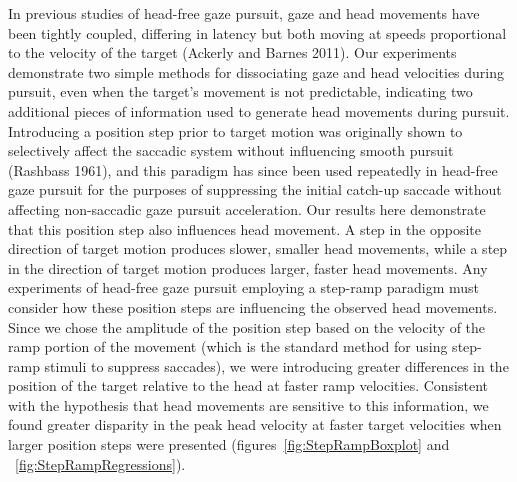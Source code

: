 \documentclass[12pt]{article}
\begin{document}
In previous studies of head-free gaze pursuit, gaze and head movements have been tightly coupled, differing in latency but both moving at speeds proportional to the velocity of the target (Ackerly and Barnes 2011). Our experiments demonstrate two simple methods for dissociating gaze and head velocities during pursuit, even when the target’s movement is not predictable, indicating two additional pieces of information used to generate head movements during pursuit.  Introducing a position step prior to target motion was originally shown to selectively affect the saccadic system without influencing smooth pursuit (Rashbass 1961), and this paradigm has since been used repeatedly in head-free gaze pursuit for the purposes of suppressing the initial catch-up saccade without affecting non-saccadic gaze pursuit acceleration. Our results here demonstrate that this position step also influences head movement. A step in the opposite direction of target motion produces slower, smaller head movements, while a step in the direction of target motion produces larger, faster head movements. Any experiments of head-free gaze pursuit employing a step-ramp paradigm must consider how these position steps are influencing the observed head movements. Since we chose the amplitude of the position step based on the velocity of the ramp portion of the movement (which is the standard method for using step-ramp stimuli to suppress saccades), we were introducing greater differences in the position of the target relative to the head at faster ramp velocities. Consistent with the hypothesis that head movements are sensitive to this information, we found greater disparity in the peak head velocity at faster target velocities when larger position steps were presented (figures~\ref{fig:StepRampBoxplot} and ~\ref{fig:StepRampRegressions}).
\end{document}
